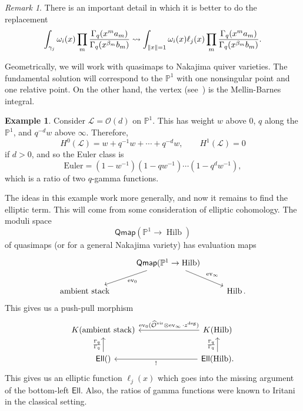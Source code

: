 \documentclass[leqno, openany]{memoir}
\theoremstyle{definition}
\newtheorem{exm}[thm]{Example}
\theoremstyle{remark}
\newtheorem{rmk}[thm]{Remark}
\theoremstyle{plain}
\theoremstyle{definition}
\theoremstyle{remark}
\renewcommand{\P}{\mathbb{P}}
\newcommand{\mc}[1]{\mathcal{#1}}
\newcommand{\mr}[1]{\mathrm{#1}}
\newcommand{\ms}[1]{\mathsf{#1}}
\newcommand{\on}[1]{\operatorname{#1}}
\newcommand{\wh}[1]{\widehat{#1}}
\DeclareMathOperator{\Hilb}{Hilb}
\begin{document}
\begin{rmk}
    There is an important detail in which it is better to do the replacement
    \[ \int_{\gamma_j} \omega_i(x) \prod_m \frac{\Gamma_q(x^m a_m)}{\Gamma_q(x^{\beta_m} b_m)} \rightsquigarrow \int_{\norm{x}=1} \omega_i(x) \ell_j(x) \prod_m \frac{\Gamma_q(x^m a_m)}{\Gamma_q(x^{\beta_m} b_m)}. \]
\end{rmk}

Geometrically, we will work with quasimaps to Nakajima quiver varieties. The fundamental solution will correspond to the $\P^1$ with one nonsingular point and one relative point. On the other hand, the vertex (see~\cite[Section 7.4]{pcmi}) is the Mellin-Barnes integral.

\begin{exm}
    Consider $\mc{L} = \mc{O}(d)$ on $\P^1$. This has weight $w$ above $0$, $q$ along the $\P^1$, and $q^{-d} w$ above $\infty$. Therefore,
    \[ H^0(\mc{L}) = w + q^{-1} w + \cdots + q^{-d} w, \qquad H^1(\mc{L}) = 0 \]
    if $d > 0$, and so the Euler class is
    \[ \mr{Euler} = (1-w^{-1})(1-qw^{-1}) \cdots (1-q^dw^{-1}), \]
    which is a ratio of two $q$-gamma functions.
\end{exm}

The ideas in this example work more generally, and now it remains to find the elliptic term. This will come from some consideration of elliptic cohomology. The moduli space
\[ \ms{Qmap}(\P^1 \to \Hilb) \]
of quasimaps (or for a general Nakajima variety) has evaluation maps
\begin{equation*}
\begin{tikzcd}
    & \ms{Qmap}(\P^1 \to \Hilb) \ar{dl}{\mr{ev}_0} \ar{dr}{\mr{ev}_{\infty}} \\
    \text{ambient stack} & & \Hilb.
\end{tikzcd}
\end{equation*}
This gives us a push-pull morphism
\begin{equation*}
\begin{tikzcd}
    K(\text{ambient stack}) & & & K(\Hilb) \ar[swap]{lll}{\on{ev}_0(\wh{\mc{O}}^{\mr{vir}} \otimes \on{ev}_{\infty} \cdot z^{\deg})} \\
    \ms{Ell}() \ar{u}{\frac{\Gamma_q}{\Gamma_q}} & & & \ms{Ell}(\Hilb) \ar{u}{\frac{\Gamma_q}{\Gamma_q}} \ar{lll}{!}.
\end{tikzcd}
\end{equation*}
This gives us an elliptic function $\ell_j(x)$ which goes into the missing argument of the bottom-left $\ms{Ell}$. Also, the ratios of gamma functions were known to Iritani in the classical setting.
\end{document}
